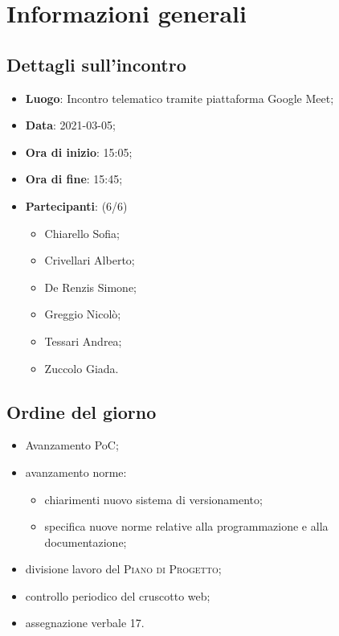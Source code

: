 \section{Informazioni generali}

\subsection{Dettagli sull'incontro}
\begin{itemize}
\item \textbf{Luogo}: Incontro telematico tramite piattaforma Google Meet;
\item \textbf{Data}: 2021-03-05;
\item \textbf{Ora di inizio}: 15:05;
\item \textbf{Ora di fine}: 15:45;
\item \textbf{Partecipanti}: (6/6)
\begin{itemize}
	\item Chiarello Sofia;
	\item Crivellari Alberto;
	\item De Renzis Simone;
	\item Greggio Nicolò;
	\item Tessari Andrea;
	\item Zuccolo Giada.
\end{itemize}
\end{itemize}

\subsection{Ordine del giorno}
\begin{itemize}
    \item Avanzamento PoC;
    \item avanzamento norme:
    \begin{itemize}
    	\item chiarimenti nuovo sistema di versionamento;
    	\item specifica nuove norme relative alla programmazione e alla documentazione;
    \end{itemize}
	\item divisione lavoro del \textsc{Piano di Progetto};
	\item controllo periodico del cruscotto web;
	\item assegnazione verbale 17.
\end{itemize}



